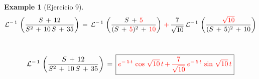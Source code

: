 \documentclass[a4paper,11pt,openany]{book}
\newtheorem{exmp}{Example}[section]
\begin{document}
\begin{exmp}[Ejercicio 9]
\textcolor{candyapplered}{}\,$$\mathcal{L}^{-\,1}\,\left(\dfrac{S\,+\,12}{S^{2}\,+\,10\,S\,+\,35} \right)\,=\,\mathcal{L}^{-\,1}\,\left(\dfrac{S\,+\,\textcolor{candyapplered}{5} }{(S\,+\,\textcolor{candyapplered}{5})^{2}\,+\,\textcolor{candyapplered}{10}} \right)\,\textcolor{candyapplered}{+}\,\dfrac{7}{\sqrt{10}}\, \mathcal{L}^{-\,1}\,\left(\dfrac{\textcolor{candyapplered}{\sqrt{10} } }{ (S\,+\,5)^{2}\,+\,10} \right)$$
 
\textcolor{candyapplered}{}\,$$\mathcal{L}^{-\,1}\,\left(\dfrac{S\,+\,12}{S^{2}\,+\,10\,S\,+\,35} \right)\,=\,\boxed{\textcolor{candyapplered}{e^{-\,5\,t}\,\cos\,\sqrt{10}\,t\,\textcolor{candyapplered}{+}\,\dfrac{7}{\sqrt{10}}\,e^{-\,5\,t}\,\sin\,\sqrt{10}\,t} }  $$
 
\end{exmp}
 
\end{document}
